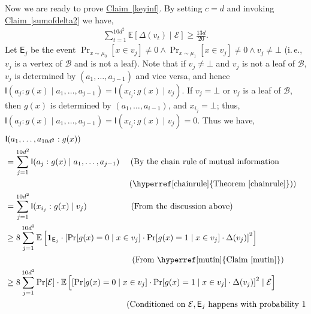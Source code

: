 \documentclass[11pt]{article}
\numberwithin{equation}{section}
\theoremstyle{definition}
\theoremstyle{plain}
\newcommand{\ie}{i.\,e.}
\newcommand{\expref}[2]{\hyperref[#2]{#1~\ref{#2}}}
\newcommand{\clB}{\mathcal{B}}
\newcommand{\clE}{\mathcal{E}}
\newcommand{\E}{\mathbb{E}}
\newcommand{\I}{\mathsf{I}}
\begin{document}
Now we are ready to prove \expref{Claim}{keyinf}. By setting $c=d$ and invoking \expref{Claim}{sumofdelta2} we have,
\begin{align}
\sum_{t=1}^{10d^2} \E[\Delta(v_t) \mid \clE] \geq \frac{13d}{20}. \label{deltabound}
\end{align}
Let $\mathsf{E}_j$ be the event $\Pr_{x \sim \mu_0}[x \in v_j] \neq 0 \wedge \Pr_{x \sim \mu_1}[x \in v_j] \neq 0 \wedge v_j \neq \bot$ (\ie, $v_j$ is a vertex of $\clB$ and is not a leaf). Note that if $v_j \neq \bot$ and $v_j$ is not a leaf of $\clB$, $v_j$ is determined by $(a_1, \ldots, a_{j-1})$ and vice versa, and hence $\I(a_j:g(x) \mid a_1, \ldots, a_{j-1})=\I(x_{i_j}:g(x) \mid v_j)$. If $v_j=\bot$ or $v_j$ is a leaf of $\clB$, then $g(x)$ is determined by $(a_1, \ldots, a_{i-1})$, and $x_{i_j}=\bot$; thus, $\I(a_j:g(x) \mid a_1, \ldots, a_{j-1})=\I(x_{i_j}:g(x) \mid v_j)=0$. Thus we have,
\begin{align}
&\I(a_1, \ldots, a_{10d^2}:g(x)) \nonumber \\
&= \sum_{j=1}^{10d^2} \I(a_j:g(x) \mid a_1, \ldots, a_{j-1}) \mbox{\ \ \ \ (By the chain rule of mutual information} \nonumber \\
&\mbox{\ \ \ \ \ \ \ \ \ \ \ \ \ \ \ \ \ \ \ \ \  \ \ \ \ \ \ \ \ \ \ \ \ \ \ \ \ \ \ \ \ \ \ \ \ (\expref{Theorem}{chainrule}))}\nonumber \\
&= \sum_{j=1}^{10d^2} \I(x_{i_j}:g(x) \mid v_j) \mbox{\ \ \ \ \ \ \ \ \ \ \ \ \ \ \ \ (From the discussion above)} \nonumber \\
%
& \geq 8 \sum_{j=1}^{10d^2} \E \left[\mathbf{1}_{\mathsf{E}_j}\cdot\left[\Pr[g(x)=0 \mid x \in v_j] \cdot \Pr[g(x)=1 \mid x \in v_j] \cdot \Delta(v_j)\right]^2\right] \nonumber \\
&\qquad \qquad \qquad \qquad \mbox{\ \ \ \ \ \ \ \ \ \ \ \ \ \ \ \ \ \ \ \ \ \  (From \expref{Claim}{mutin})} \\ \nonumber
&\geq 8 \sum_{j=1}^{10d^2} \Pr[\clE] \cdot \E\left[\left[\Pr[g(x)=0 \mid x \in v_{j}] \cdot \Pr[g(x)=1 \mid x \in v_{j}] \cdot \Delta(v_j)\right]^2 \mid \clE\right] \\ \nonumber
&\qquad \qquad \qquad \qquad \mbox{\ \ \ \ \ \ \ \ \ \ \ \ \ \ \ \ \ \ \ \ (Conditioned on $\clE, \mathsf{E}_j$ happens with probability $1$} \nonumber
\end{align}
\end{document}
